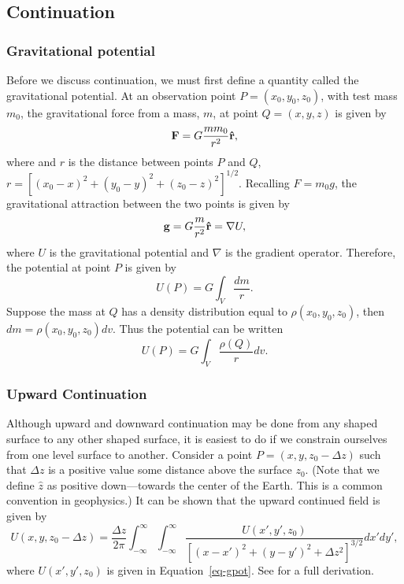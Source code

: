 \subsection{Continuation}
\subsubsection{Gravitational potential}
Before we discuss continuation, we must first define a quantity called the gravitational potential.  At an observation point $P = (x_{0}, y_{0}, z_{0})$, with test mass $m_{0}$, the gravitational force from a mass, $m$, at point $Q = (x,y,z)$ is given by
\begin{equation}
    \vb{F} = G \frac{m m_{0}}{r^{2}}\vu{r},
\end{equation}
where and $r$ is the distance between points $P$ and $Q$, $r = \left[(x_{0} - x)^2 +
(y_{0} - y)^2 + (z_{0} - z)^2\right]^{1/2}$.  Recalling $F = m_{0} g$, the
gravitational attraction between the two points is given by
\begin{equation}
    \vb{g} = G \frac{m}{r^{2}}\vu{r} = \nabla U,
\end{equation}
where $U$ is the gravitational potential and $\nabla$ is the gradient operator.  Therefore, the potential at point $P$ is given by
\begin{equation}
    U(P) = G\int_{V} \frac{dm}{r}.
\end{equation}
Suppose the mass at $Q$ has a density distribution equal to $\rho(x_{0},y_{0},z_{0})$, then $dm = \rho(x_{0},y_{0},z_{0}) dv$.  Thus the potential can be written
\begin{equation}
    U(P) = G\int_{V} \frac{\rho(Q)}{r} dv.
    \label{eq-gpot}
\end{equation}

\subsubsection{Upward Continuation}
Although upward and downward continuation may be done from any shaped surface to any other shaped surface, it is easiest to do if we constrain ourselves from one level surface to another.  Consider a point $P = (x, y, z_{0} - \Delta z)$ such that $\Delta z$ is a positive value some distance above the surface $z_{0}$.  (Note that we define $\hat{z}$ as positive down---towards the center of the Earth.  This is a common convention in geophysics.)  It can be shown that the upward continued field is given by
\begin{equation}
    U(x,y,z_{0} - \Delta z) = \frac{\Delta z}{2 \pi} 
    \int_{-\infty}^{\infty} \int_{-\infty}^{\infty} 
    \frac{U(x',y',z_{0})} 
    {\left[(x - x')^2 + (y - y')^2 + \Delta z^2 \right]^{3/2}}
    dx' dy',
\end{equation}
where $U(x',y',z_{0})$ is given in Equation~\ref{eq-gpot}.  See \citet{Blakely1995} for a full derivation.

